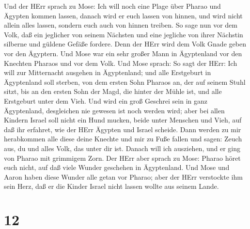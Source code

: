  Und der HErr sprach zu Mose: Ich will noch eine Plage über
Pharao und Ägypten kommen lassen, danach wird er euch lassen von hinnen,
und wird nicht allein alles lassen, sondern euch auch von hinnen
treiben.  So sage nun vor dem Volk, daß ein jeglicher von
seinem Nächsten und eine jegliche von ihrer Nächstin silberne und
güldene Gefäße fordere.  Denn der HErr wird dem Volk Gnade
geben vor den Ägyptern. Und Mose war ein sehr großer Mann in Ägyptenland
vor den Knechten Pharaos und vor dem Volk.  Und Mose sprach:
So sagt der HErr: Ich will zur Mitternacht ausgehen in Ägyptenland;
 und alle Erstgeburt in Ägyptenland soll sterben, von dem
ersten Sohn Pharaos an, der auf seinem Stuhl sitzt, bis an den ersten
Sohn der Magd, die hinter der Mühle ist, und alle Erstgeburt unter dem
Vieh.  Und wird ein groß Geschrei sein in ganz Ägyptenland,
desgleichen nie gewesen ist noch werden wird;  aber bei
allen Kindern Israel soll nicht ein Hund mucken, beide unter Menschen
und Vieh, auf daß ihr erfahret, wie der HErr Ägypten und Israel scheide.
 Dann werden zu mir herabkommen alle diese deine Knechte und
mir zu Fuße fallen und sagen: Zeuch aus, du und alles Volk, das unter
dir ist. Danach will ich ausziehen, und er ging von Pharao mit grimmigem
Zorn.  Der HErr aber sprach zu Mose: Pharao höret euch
nicht, auf daß viele Wunder geschehen in Ägyptenland.  Und
Mose und Aaron haben diese Wunder alle getan vor Pharao; aber der HErr
verstockte ihm sein Herz, daß er die Kinder Israel nicht lassen wollte
aus seinem Lande.

\hypertarget{section-11}{%
\section{12}\label{section-11}}

